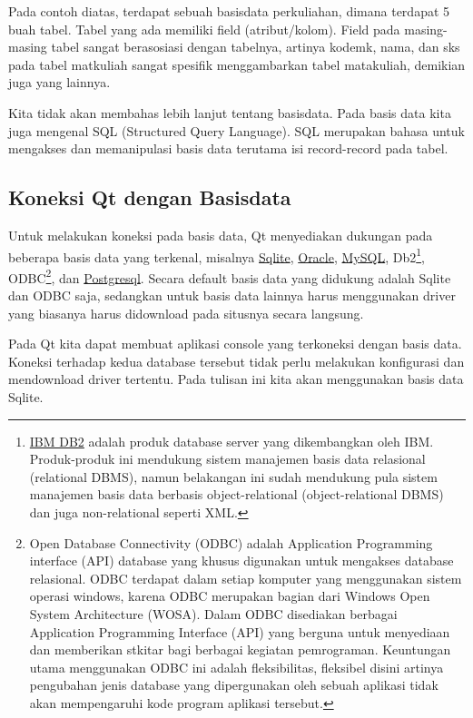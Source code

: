 Pada contoh diatas, terdapat sebuah basisdata perkuliahan, dimana
terdapat 5 buah tabel. Tabel yang ada memiliki field (atribut/kolom).
Field pada masing-masing tabel sangat berasosiasi dengan tabelnya,
artinya kodemk, nama, dan sks pada tabel matkuliah sangat spesifik
menggambarkan tabel matakuliah, demikian juga yang lainnya.

Kita tidak akan membahas lebih lanjut tentang basisdata. Pada basis data
kita juga mengenal SQL (Structured Query Language). SQL merupakan bahasa
untuk mengakses dan memanipulasi basis data terutama isi record-record
pada tabel.

\subsection{Koneksi Qt dengan Basisdata}\label{koneksi-qt-dengan-basisdata}

Untuk melakukan koneksi pada basis data, Qt menyediakan dukungan pada
beberapa basis data yang terkenal, misalnya
\href{https://www.sqlite.org/about.html}{Sqlite},
\href{https://en.wikipedia.org/wiki/Oracle_Database}{Oracle},
\href{https://www.mysql.com/about/}{MySQL}, Db2\footnote{\href{https://en.wikipedia.org/wiki/IBM_DB2}{IBM
  DB2} adalah produk database server yang dikembangkan oleh IBM.
  Produk-produk ini mendukung sistem manajemen basis data relasional
  (relational DBMS), namun belakangan ini sudah mendukung pula sistem
  manajemen basis data berbasis object-relational (object-relational
  DBMS) dan juga non-relational seperti XML.}, ODBC\footnote{Open
  Database Connectivity (ODBC) adalah Application Programming interface
  (API) database yang khusus digunakan untuk mengakses database
  relasional. ODBC terdapat dalam setiap komputer yang menggunakan
  sistem operasi windows, karena ODBC merupakan bagian dari Windows Open
  System Architecture (WOSA). Dalam ODBC disediakan berbagai Application
  Programming Interface (API) yang berguna untuk menyediaan dan
  memberikan stkitar bagi berbagai kegiatan pemrograman. Keuntungan
  utama menggunakan ODBC ini adalah fleksibilitas, fleksibel disini
  artinya pengubahan jenis database yang dipergunakan oleh sebuah
  aplikasi tidak akan mempengaruhi kode program aplikasi tersebut.}, dan
\href{https://id.wikipedia.org/wiki/PostgreSQL}{Postgresql}. Secara
default basis data yang didukung adalah Sqlite dan ODBC saja, sedangkan
untuk basis data lainnya harus menggunakan driver yang biasanya harus
didownload pada situsnya secara langsung.

Pada Qt kita dapat membuat aplikasi console yang terkoneksi dengan basis
data. Koneksi terhadap kedua database tersebut tidak perlu melakukan
konfigurasi dan mendownload driver tertentu. Pada tulisan ini kita akan
menggunakan basis data Sqlite.

